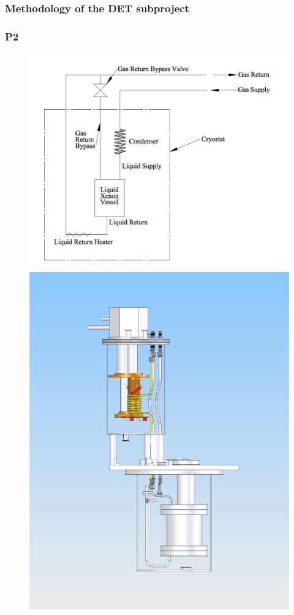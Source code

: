 \subsubsection*{Methodology of the DET subproject}

\subsubsection*{P2}

\begin{figure}[!htb]
	\centering
	\includegraphics[scale=0.35]{img/CryoGas1.png}
	\includegraphics[scale=0.35]{img/CryoGas2.png}

\end{figure}
